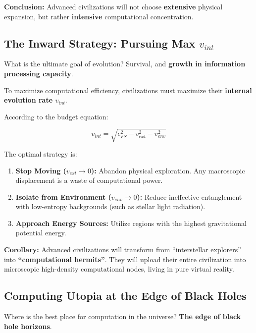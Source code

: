\textbf{Conclusion:} Advanced civilizations will not choose \textbf{extensive} physical expansion, but rather \textbf{intensive} computational concentration.

\subsection{The Inward Strategy: Pursuing Max $v_{int}$}

What is the ultimate goal of evolution? Survival, and \textbf{growth in information processing capacity}.

To maximize computational efficiency, civilizations must maximize their \textbf{internal evolution rate $v_{int}$}.

According to the budget equation:

$$v_{int} = \sqrt{c_{FS}^2 - v_{ext}^2 - v_{env}^2}$$

The optimal strategy is:

\begin{enumerate}
\item \textbf{Stop Moving ($v_{ext} \to 0$):} Abandon physical exploration. Any macroscopic displacement is a waste of computational power.

\item \textbf{Isolate from Environment ($v_{env} \to 0$):} Reduce ineffective entanglement with low-entropy backgrounds (such as stellar light radiation).

\item \textbf{Approach Energy Sources:} Utilize regions with the highest gravitational potential energy.
\end{enumerate}

\textbf{Corollary:} Advanced civilizations will transform from ``interstellar explorers'' into \textbf{``computational hermits''}. They will upload their entire civilization into microscopic high-density computational nodes, living in pure virtual reality.

\subsection{Computing Utopia at the Edge of Black Holes}

Where is the best place for computation in the universe? \textbf{The edge of black hole horizons}.

